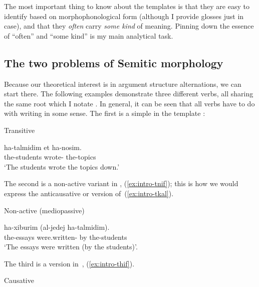  \begin{exe}
 \ex  \label{ex:1n1}
 \begin{xlist} 
 	\ex  {\tkal} 
 	\ex  {\tnif} 
 	\ex  {\tpie} 
 	\ex  {\thit} 
 	\ex  {\thif} 
 	\ex  {\tpua} 
 	\ex  {\thuf} 
 \z
\z 

The most important thing to know about the templates is that they are easy to identify based on morphophonological form (although I provide glosses just in case), and that they \emph{often} carry \emph{some kind} of meaning. Pinning down the essence of ``often'' and ``some kind'' is my main analytical task.

	\subsection{The two problems of Semitic morphology}
Because our theoretical interest is in argument structure alternations, we can start there. The following examples demonstrate three different verbs, all sharing the same root which I notate . In general, it can be seen that all verbs have to do with writing in some sense. The first is a simple  in the template {\tkal}:

 \begin{exe}
\ex 	\label{ex:intro-tkal}Transitive {\tkal} 
		
 		\gll  ha-talmidim  et ha-nosim.\\
 		  the-students wrote-  the-topics\\
 		\glt `The students wrote the topics down.' 
	
 \z 

The second is a non-active variant in {\tnif}, (\ref{ex:intro-tnif}); this is how we would express the anticausative or  version of~(\ref{ex:intro-tkal}).

 \begin{exe}
\ex  \label{ex:intro-tnif}Non-active (mediopassive) {\tnif} 
		
 		\gll  ha-xiburim  (al-jedej ha-talmidim).\\
 		  the-essays were.written- by the-students\\
 		\glt `The essays were written (by the students)'. 
	
 \z 

The third is a  version in~{\thif}, (\ref{ex:intro-thif}).

 \begin{exe}
\ex  \label{ex:intro-thif}Causative {\thif} 
		

\end{exe}
\end{exe}
\end{exe}
\end{xlist}
\end{exe}
